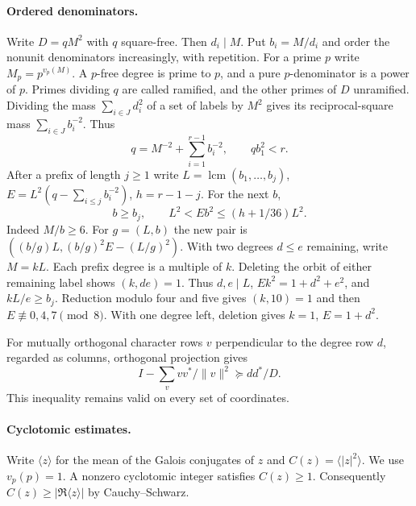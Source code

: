 \documentclass[11pt]{amsart}
\numberwithin{equation}{section}
\theoremstyle{definition}
\theoremstyle{plain}
\DeclareMathOperator{\lcm}{lcm}
\begin{document}
\paragraph{Ordered denominators.}
Write $D=qM^2$ with $q$ square-free. Then $d_i\mid M$. Put
$b_i=M/d_i$ and order the nonunit denominators increasingly, with
repetition. For a prime $p$ write $M_p=p^{v_p(M)}$. A $p$-free
degree is prime to $p$, and a pure $p$-denominator is a power of $p$.
Primes dividing $q$ are called ramified, and the other primes of $D$
unramified. Dividing the mass $\sum_{i\in J}d_i^2$ of a set of
labels by $M^2$ gives its reciprocal-square mass $\sum_{i\in J}b_i^{-2}$.
Thus
\begin{equation}
 q=M^{-2}+\sum_{i=1}^{r-1}b_i^{-2},\qquad qb_1^2<r .
\end{equation}
After a prefix of length $j\ge1$ write $L=\lcm(b_1,\ldots,b_j)$,
$E=L^2(q-\sum_{i\le j}b_i^{-2})$, $h=r-1-j$. For the next $b$,
\begin{equation}\label{eq:interval}
 b\ge b_j,\qquad L^2<Eb^2\le(h+1/36)L^2 .
\end{equation}
Indeed $M/b\ge6$. For $g=(L,b)$ the new pair is
$((b/g)L,(b/g)^2 E-(L/g)^2)$. With two degrees $d\le e$ remaining,
write $M=kL$. Each prefix degree is a multiple of $k$. Deleting
the orbit of either remaining label shows $(k,de)=1$. Thus
$d,e\mid L$, $Ek^2=1+d^2+e^2$, and $kL/e\ge b_j$.
Reduction modulo four and five gives $(k,10)=1$ and then
$E\not\equiv0,4,7\pmod8$. With one degree left, deletion gives
$k=1$, $E=1+d^2$.

For mutually orthogonal character rows $v$ perpendicular to the degree
row $d$, regarded as columns, orthogonal projection gives
\begin{equation}
 I-\sum_v vv^*/\|v\|^2\succeq dd^*/D .
\end{equation}
This inequality remains valid on every set of coordinates.

\paragraph{Cyclotomic estimates.}
Write $\langle z\rangle$ for the mean of the Galois conjugates of $z$
and $C(z)=\langle |z|^2\rangle$. We use $v_p(p)=1$.
A nonzero cyclotomic integer satisfies $C(z)\ge1$. Consequently
$C(z)\ge|\Re\langle z\rangle|$ by Cauchy--Schwarz.
\end{document}
